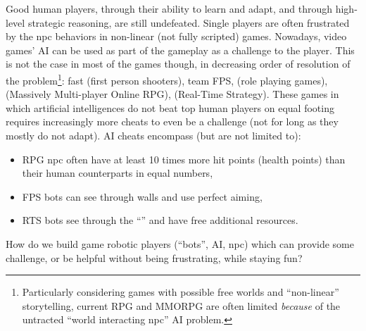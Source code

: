 Good human players, through their ability to learn and adapt, and through high-level strategic reasoning, are still undefeated. Single players are often frustrated by the \gls{npc} behaviors in non-linear (not fully scripted) games. Nowadays, video games' AI can be used as part of the gameplay as a challenge to the player. 
This is not the case in most of the games though, in decreasing order of resolution of the problem\footnote{Particularly considering games with possible free worlds and ``non-linear'' storytelling, current RPG and MMORPG are often limited \textit{because} of the untracted ``world interacting \gls{npc}'' AI problem.}: fast  (first person shooters), team FPS,  (role playing games),  (Massively Multi-player Online RPG),  (Real-Time Strategy). These games in which artificial intelligences do not beat top human players on equal footing requires increasingly more cheats to even be a challenge (not for long as they mostly do not adapt). AI cheats encompass (but are not limited to):
\begin{itemize}
\item RPG \gls{npc} often have at least 10 times more hit points (health points) than their human counterparts in equal numbers,
\item FPS bots can see through walls and use perfect aiming,
\item RTS bots see through the ``'' and have free additional resources.
\end{itemize}
How do we build game robotic players (``bots'', AI, \gls{npc}) which can provide some challenge, or be helpful without being frustrating, while staying fun?


